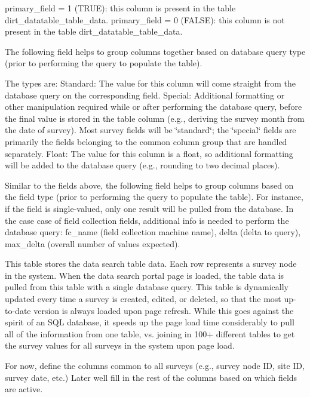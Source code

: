 primary\+\_\+field = 1 (T\+R\+UE)\+: this column is present in the table dirt\+\_\+datatable\+\_\+table\+\_\+data. primary\+\_\+field = 0 (F\+A\+L\+SE)\+: this column is not present in the table dirt\+\_\+datatable\+\_\+table\+\_\+data.

The following field helps to group columns together based on database query type (prior to performing the query to populate the table).

The types are\+: Standard\+: The value for this column will come straight from the database query on the corresponding field. Special\+: Additional formatting or other manipulation required while or after performing the database query, before the final value is stored in the table column (e.\+g., deriving the survey month from the date of survey). Most survey fields will be \char`\"{}standard\char`\"{}; the \char`\"{}special\char`\"{} fields are primarily the fields belonging to the common column group that are handled separately. Float\+: The value for this column is a float, so additional formatting will be added to the database query (e.\+g., rounding to two decimal places).

Similar to the fields above, the following field helps to group columns based on the field type (prior to performing the query to populate the table). For instance, if the field is single-\/valued, only one result will be pulled from the database. In the case case of field collection fields, additional info is needed to perform the database query\+: fc\+\_\+name (field collection machine name), delta (delta to query), max\+\_\+delta (overall number of values expected).

This table stores the data search table data. Each row represents a survey node in the system. When the data search portal page is loaded, the table data is pulled from this table with a single database query. This table is dynamically updated every time a survey is created, edited, or deleted, so that the most up-\/to-\/date version is always loaded upon page refresh. While this goes against the spirit of an S\+QL database, it speeds up the page load time considerably to pull all of the information from one table, vs. joining in 100+ different tables to get the survey values for all surveys in the system upon page load.

For now, define the columns common to all surveys (e.\+g., survey node ID, site ID, survey date, etc.) Later we\textquotesingle{}ll fill in the rest of the columns based on which fields are active.\mbox{\label{dirt__datatable_8table__schema_8inc_a5d2b9b69a657e7621354e0098fc3ada3}} 
